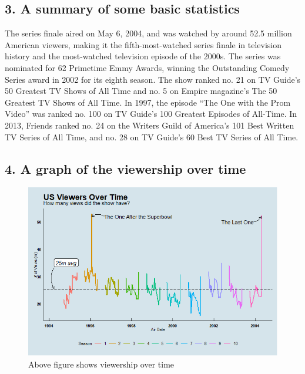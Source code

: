 \documentclass[
  letterpaper,
  DIV=11,
  numbers=noendperiod]{scrartcl}
\begin{document}
\hypertarget{a-summary-of-some-basic-statistics}{%
\subsection{3. A summary of some basic
statistics}\label{a-summary-of-some-basic-statistics}}

The series finale aired on May 6, 2004, and was watched by around 52.5
million American viewers, making it the fifth-most-watched series finale
in television history and the most-watched television episode of the
2000s. The series was nominated for 62 Primetime Emmy Awards, winning
the Outstanding Comedy Series award in 2002 for its eighth season. The
show ranked no. 21 on TV Guide's 50 Greatest TV Shows of All Time and
no. 5 on Empire magazine's The 50 Greatest TV Shows of All Time. In
1997, the episode ``The One with the Prom Video'' was ranked no. 100 on
TV Guide's 100 Greatest Episodes of All-Time. In 2013, Friends ranked
no. 24 on the Writers Guild of America's 101 Best Written TV Series of
All Time, and no. 28 on TV Guide's 60 Best TV Series of All Time.

\hypertarget{a-graph-of-the-viewership-over-time}{%
\subsection{4. A graph of the viewership over
time}\label{a-graph-of-the-viewership-over-time}}

\begin{figure}

{\centering \includegraphics{friends_viewer.png}

}

\caption{Above figure shows viewership over time}

\end{figure}
\end{document}

